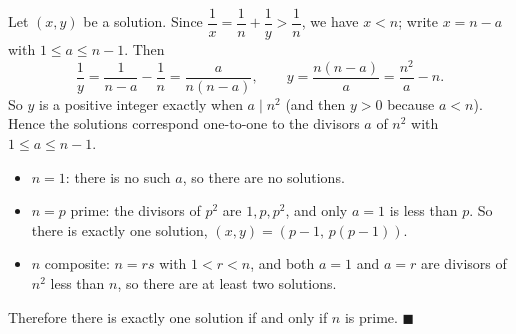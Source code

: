Let $(x,y)$ be a solution. Since $\dfrac{1}{x}=\dfrac{1}{n}+\dfrac{1}{y}>\dfrac{1}{n}$, we have $x<n$; write $x=n-a$ with $1\le a\le n-1$. Then
\[
\dfrac{1}{y}=\dfrac{1}{n-a}-\dfrac{1}{n}=\dfrac{a}{n(n-a)},\qquad y=\dfrac{n(n-a)}{a}=\dfrac{n^2}{a}-n .
\]
So $y$ is a positive integer exactly when $a\mid n^2$ (and then $y>0$ because $a<n$). Hence the solutions correspond one-to-one to the divisors $a$ of $n^2$ with $1\le a\le n-1$.
\begin{itemize}
\item $n=1$: there is no such $a$, so there are no solutions.
\item $n=p$ prime: the divisors of $p^2$ are $1,p,p^2$, and only $a=1$ is less than $p$. So there is exactly one solution, $(x,y)=(p-1,\,p(p-1))$.
\item $n$ composite: $n=rs$ with $1<r<n$, and both $a=1$ and $a=r$ are divisors of $n^2$ less than $n$, so there are at least two solutions.
\end{itemize}
Therefore there is exactly one solution if and only if $n$ is prime. $\blacksquare$
